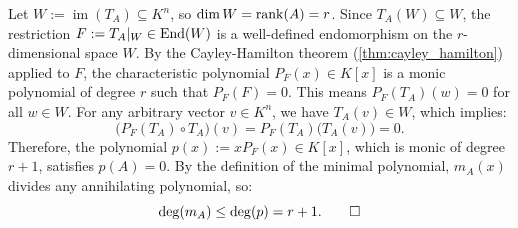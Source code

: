 \begin{exercisesolution}
\label{sol:degree_minimal_poly_bounded_by_rank}
Let $W := \operatorname{im}(T_A) \subseteq K^n$, so $\dim W = \operatorname{rank}(A) = r$.
Since $T_A(W) \subseteq W$, the restriction $F := T_A|_W \in \operatorname{End}(W)$ is a well-defined endomorphism on the $r$-dimensional space $W$.
By the Cayley-Hamilton theorem (\cref{thm:cayley_hamilton}) applied to $F$, the characteristic polynomial $P_F(x) \in K[x]$ is a monic polynomial of degree $r$ such that $P_F(F) = 0$.
This means $P_F(T_A)(w) = 0$ for all $w \in W$.
For any arbitrary vector $v \in K^n$, we have $T_A(v) \in W$, which implies:
\[
\big(P_F(T_A) \circ T_A\big)(v) = P_F(T_A)\big(T_A(v)\big) = 0.
\]
Therefore, the polynomial $p(x) := x P_F(x) \in K[x]$, which is monic of degree $r + 1$, satisfies $p(A) = 0$.
By the definition of the minimal polynomial, $m_A(x)$ divides any annihilating polynomial, so:
\[
\deg(m_A) \le \deg(p) = r + 1. \qedhere
\]
\end{exercisesolution}

